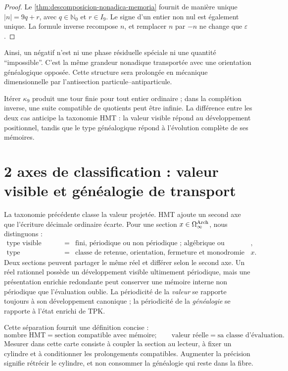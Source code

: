 \begin{proof}
Le \cref{thm:descomposicion-nonadica-memoria} fournit de manière unique
\(|n|=9q+r\), avec \(q\in\mathbb N_0\) et \(r\in I_9\). Le signe d'un entier
non nul est également unique. La formule inverse recompose \(n\), et remplacer
\(n\) par \(-n\) ne change que \(\varepsilon\).
\end{proof}

Ainsi, un négatif n'est ni une phase résiduelle spéciale ni une quantité
``impossible''. C'est la même grandeur nonadique transportée avec une orientation
généalogique opposée. Cette structure sera prolongée en mécanique dimensionnelle
par l'antisection particule--antiparticule.

Itérer \(\kappa_9\) produit une tour finie pour tout entier ordinaire ; dans
la complétion inverse, une suite compatible de quotients peut être
infinie. La différence entre les deux cas anticipe la taxonomie HMT : la valeur
visible répond au développement positionnel, tandis que le type généalogique
répond à l'évolution complète de ses mémoires.

\section{2 axes de classification : valeur visible et généalogie de transport}

La taxonomie précédente classe la valeur projetée. HMT ajoute un second
axe que l'écriture décimale ordinaire écarte. Pour une section
\(x\in\Omega_\infty^{\rm Arch}\), nous distinguons :
\[
 \begin{array}{rcl}
 \text{type visible}&=&
 \text{fini, périodique ou non périodique ; algébrique ou transcendant},\\
 \text{type généalogique}&=&
 \text{classe de retenue, orientation, fermeture et monodromie de }x.
 \end{array}
\]
Deux sections peuvent partager le même réel et différer selon le second axe. Un
réel rationnel possède un développement visible ultimement périodique, mais une
présentation enrichie redondante peut conserver une mémoire interne non
périodique que l'évaluation oublie. La périodicité de la \emph{valeur} se
rapporte toujours à son développement canonique ; la périodicité de la
\emph{généalogie} se rapporte à l'état enrichi de TPK.

Cette séparation fournit une définition concise :
\begin{equation}
 \boxed{
 \text{nombre HMT}
 =
 \text{section compatible avec mémoire};
 \qquad
 \text{valeur réelle}
 =
 \text{sa classe d'évaluation}.}
 \label{eq:numero-hmt-y-valor-real}
\end{equation}
Mesurer dans cette carte consiste à coupler la section au lecteur, à fixer un cylindre et à
conditionner les prolongements compatibles. Augmenter la précision signifie
rétrécir le cylindre, et non consommer la généalogie qui reste dans la fibre.

